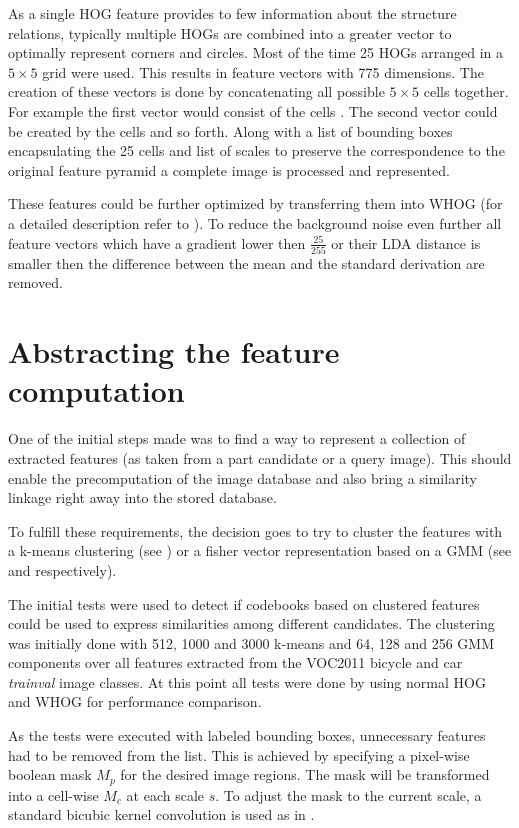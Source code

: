 As a single \ac{HOG} feature provides to few information about the structure relations, typically multiple \acp{HOG} are combined into a greater vector to optimally represent corners and circles. Most of the time 25 \acp{HOG} arranged in a $5\times5$ grid were used. This results in feature vectors with 775 dimensions. The creation of these vectors is done by concatenating all possible $5\times5$ cells together. For example the first vector would consist of the cells . The second vector could be created by the cells  and so forth. Along with a list of bounding boxes encapsulating the 25 cells and list of scales to preserve the correspondence to the original feature pyramid a complete image is processed and represented.
\par
These features could be further optimized by transferring them into \ac{WHOG} (for a detailed description refer to ). To reduce the background noise even further all feature vectors which have a gradient lower then $\frac{25}{255}$ or their \ac{LDA} distance is smaller then the difference between the mean and the standard derivation are removed.

\section{Abstracting the feature computation}

One of the initial steps made was to find a way to represent a collection of extracted features (as taken from a part candidate or a query image). This should enable the precomputation of the image database and also bring a similarity linkage right away into the stored database.

To fulfill these requirements, the decision goes to try to cluster the features with a k-means clustering (see ) or a fisher vector representation based on a \acf{GMM} (see  and  respectively).
\par
The initial tests were used to detect if codebooks based on clustered features could be used to express similarities among different candidates.
The clustering was initially done with 512, 1000 and 3000 k-means and 64, 128 and 256 \ac{GMM} components over all features extracted from the \ac{VOC2011} bicycle and car \textit{trainval} image classes.
At this point all tests were done by using normal \ac{HOG} and \acl{WHOG} for performance comparison.
\par
As the tests were executed with labeled bounding boxes, unnecessary features had to be removed from the list. This is achieved by specifying a pixel-wise boolean mask $M_p$ for the desired image regions. The mask will be transformed into a cell-wise $M_c$ at each scale $s$. To adjust the mask to the current scale, a standard bicubic kernel convolution is used as in .

